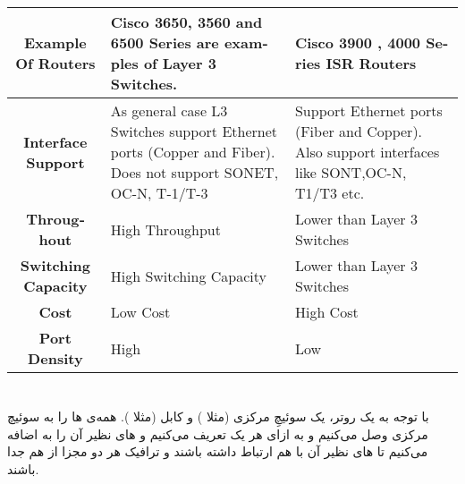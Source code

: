 \documentclass{article}
\begin{document}
\begin{latin}
\begin{table}[H]
{\begin{tabular}{|c|l|l|}
\textbf{Example Of Routers}        & Cisco 3650, 3560 and 6500 Series are examples of Layer 3 Switches.                                           & Cisco 3900 , 4000 Series ISR Routers                                                          \\ \hline
\textbf{Interface Support}         & As general case L3 Switches support Ethernet ports (Copper and Fiber). Does not support SONET, OC-N, T-1/T-3 & Support Ethernet ports (Fiber and Copper). Also support interfaces like SONT,OC-N, T1/T3 etc. \\ \hline
\textbf{Throughout}                & High Throughput                                                                                              & Lower than Layer 3 Switches                                                                   \\ \hline
\textbf{Switching Capacity}        & High Switching Capacity                                                                                      & Lower than Layer 3 Switches                                                                   \\ \hline
\textbf{Cost}                      & Low Cost                                                                                                     & High Cost                                                                                     \\ \hline
\textbf{Port Density}              & High                                                                                                         & Low                                                                                           \\ \hline
\end{tabular}%
}
\end{table}
\end{latin}


\section{}
\subsection{}
با توجه به  یک روتر، یک سوئیچِ مرکزی (مثلا ) و کابل (مثلا ). همه‌ی ها را به سوئیچ مرکزی وصل می‌کنیم و به ازای هر  یک  تعریف می‌کنیم و های نظیر آن  را به  اضافه می‌کنیم تا های نظیر آن  با هم ارتباط داشته باشند و ترافیک هر دو  مجزا از هم جدا باشند.
\end{document}

